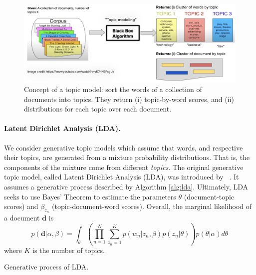 \documentclass[10pt,twocolumn,letterpaper]{article}
\begin{document}
\begin{figure}
\begin{center}
\includegraphics[width=1\linewidth]{topic-model-concept.png}
\end{center}
   \caption{Concept of a topic model: sort the words of a collection of documents into topics. They return (i) topic-by-word scores, and (ii) distributions for each topic over each document.}
\label{fig:concept}
\end{figure}

\paragraph{Latent Dirichlet Analysis (LDA).} 
We consider generative topic models which assume that words, and respective their topics, are generated from a mixture probability distributions.
That is, the components of the mixture come from different \textit{topics}.
The original generative topic model, called Latent Dirichlet Analysis (LDA), was introduced by ~\cite{blei2012probabilistic}.
It assumes a generative process described by Algorithm \ref{alg:lda}.
Ultimately, LDA seeks to use Bayes' Theorem to estimate the parameters $\theta$ (document-topic scores) and $\beta_{z_n}$ (topic-document-word scores).
Overall, the marginal likelihood of a document $\bm{d}$ is 
\begin{equation}\label{eq:3}
    p(\bm{d}|\alpha,\beta) = \int_{\theta} \left(\prod_{n=1}^{N} \sum_{z_n=1}^{K} p(w_n|z_n,\beta) p(z_n|\theta)\right) p(\theta|\alpha)d\theta
\end{equation}
where $K$ is the number of topics.
\begin{algorithm}[t]\label{alg:lda}
\SetAlgoLined
\caption{Generative process of LDA.}
\end{algorithm}
\end{document}
